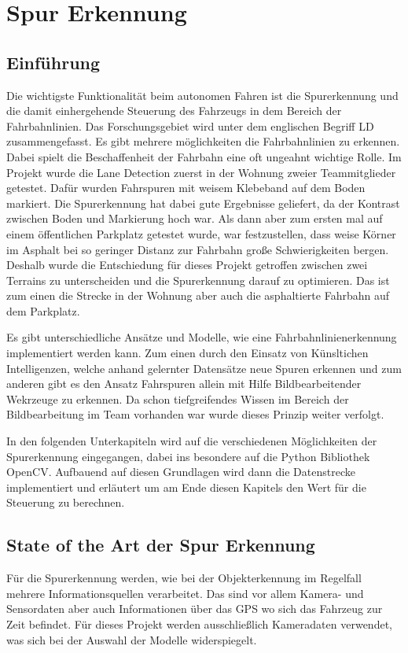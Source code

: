 \chapter{Spur Erkennung}


\section{Einführung} %
Die wichtigste Funktionalität beim autonomen Fahren ist die Spurerkennung und die damit einhergehende Steuerung des Fahrzeugs in dem Bereich der Fahrbahnlinien. Das Forschungsgebiet wird unter dem englischen Begriff \ac{LD} zusammengefasst. Es gibt mehrere möglichkeiten die Fahrbahnlinien zu erkennen. 
Dabei spielt die Beschaffenheit der Fahrbahn eine oft ungeahnt wichtige Rolle. Im Projekt wurde die Lane Detection zuerst in der Wohnung zweier Teammitglieder getestet. Dafür wurden Fahrspuren mit weisem Klebeband auf dem Boden markiert. Die Spurerkennung hat dabei gute Ergebnisse geliefert, da der Kontrast zwischen Boden und Markierung hoch war. Als dann aber zum ersten mal auf einem öffentlichen Parkplatz getestet wurde, war festzustellen, dass weise Körner im Asphalt bei so geringer Distanz zur Fahrbahn große Schwierigkeiten bergen. Deshalb wurde die Entschiedung für dieses Projekt getroffen zwischen zwei Terrains zu unterscheiden und die Spurerkennung darauf zu optimieren. Das ist zum einen die Strecke in der Wohnung aber auch die asphaltierte Fahrbahn auf dem Parkplatz.

Es gibt unterschiedliche Ansätze und Modelle, wie eine Fahrbahnlinienerkennung implementiert werden kann. Zum einen durch den Einsatz von Künsltichen Intelligenzen, welche anhand gelernter Datensätze neue Spuren erkennen und zum anderen gibt es den Ansatz Fahrspuren allein mit Hilfe Bildbearbeitender Wekrzeuge zu erkennen. Da schon tiefgreifendes Wissen im Bereich der Bildbearbeitung im Team vorhanden war wurde dieses Prinzip weiter verfolgt.

In den folgenden Unterkapiteln wird auf die verschiedenen Möglichkeiten der Spurerkennung eingegangen, dabei ins besondere auf die Python Bibliothek OpenCV. Aufbauend auf diesen Grundlagen wird dann die Datenstrecke implementiert und erläutert um am Ende diesen Kapitels den Wert für die Steuerung zu berechnen.


\section{State of the Art der Spur Erkennung} %
Für die Spurerkennung werden, wie bei der Objekterkennung im Regelfall mehrere Informationsquellen verarbeitet. Das sind vor allem Kamera- und Sensordaten aber auch Informationen über das \ac{GPS} wo sich das Fahrzeug zur Zeit befindet. Für dieses Projekt werden ausschließlich Kameradaten verwendet, was sich bei der Auswahl der Modelle widerspiegelt.

